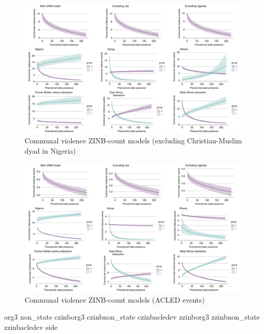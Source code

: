 \begin{figure}
	\centering
	\includegraphics[width=1\linewidth]{R/Output/noreligioninnigplots.pdf}
	\caption{Communal violence ZINB-count models (excluding Christian-Muslim
	dyad in Nigeria)}
	\label{noreligion}
\end{figure}

\begin{figure}
	\centering
	\includegraphics[width=1\linewidth]{R/Output/acledplots.pdf}
	\caption{Communal violence ZINB-count models (ACLED events)}
	\label{acledplots}
\end{figure}

{org3}
{non_state}
{czinborg3}
{czinbnon_state}
{czinbacledev}
{zzinborg3}
{zzinbnon_state}
{zzinbacledev}
{side}

	
